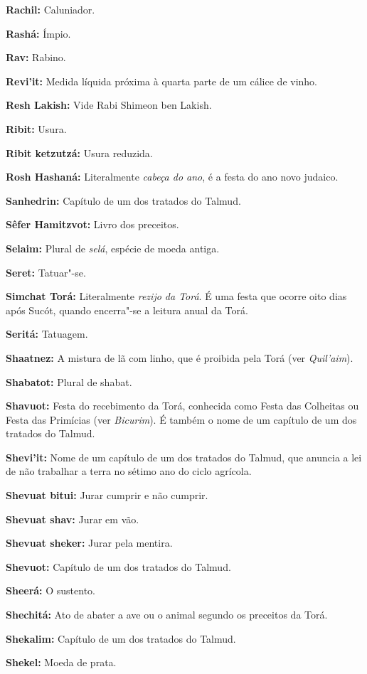 \begin{hangparas}{.25in}{1}
{\textbf{Rachil:} Caluniador.

\textbf{Rashá:} Ímpio.

\textbf{Rav:} Rabino.

\textbf{Revi'it:} Medida líquida próxima à quarta parte de um cálice de vinho.

\textbf{Resh Lakish:} Vide Rabi Shimeon ben Lakish.

\textbf{Ribit:} Usura.

\textbf{Ribit ketzutzá:} Usura reduzida.

\textbf{Rosh Hashaná:} Literalmente \emph{cabeça do ano}, é a 
festa do ano novo judaico.

\textbf{Sanhedrin:} Capítulo de um dos tratados do Talmud. 

\textbf{Sêfer Hamitzvot:} Livro dos preceitos.

\textbf{Selaim:} Plural de \emph{selá}, espécie de moeda antiga.

\textbf{Seret:} Tatuar"-se.

\textbf{Simchat Torá:} Literalmente \emph{rezijo da Torá}. É uma festa que ocorre oito 
dias após Sucót, quando encerra"-se a leitura anual da Torá.

\textbf{Seritá:} Tatuagem.

\textbf{Shaatnez:} A mistura de lã com linho, que é proibida 
pela Torá (ver \emph{Quil'aim}).

\textbf{Shabatot:} Plural de shabat.

\textbf{Shavuot:} Festa do recebimento da Torá, conhecida como Festa 
das Colheitas ou Festa das Primícias (ver \emph{Bicurim}). É também o 
nome de um capítulo de um dos tratados do Talmud.

\textbf{Shevi'it:} Nome de um capítulo de um dos tratados do Talmud, 
que anuncia a lei de não trabalhar a terra no sétimo ano do ciclo agrícola.

\textbf{Shevuat bitui:} Jurar cumprir e não cumprir.

\textbf{Shevuat shav:} Jurar em vão.

\textbf{Shevuat sheker:} Jurar pela mentira.

\textbf{Shevuot:} Capítulo de um dos tratados do Talmud.

\textbf{Sheerá:} O sustento.

\textbf{Shechitá:} Ato de abater a ave ou o animal segundo os preceitos
da Torá.

\textbf{Shekalim:} Capítulo de um dos tratados do Talmud.

\textbf{Shekel:} Moeda de prata.

}
\end{hangparas}
